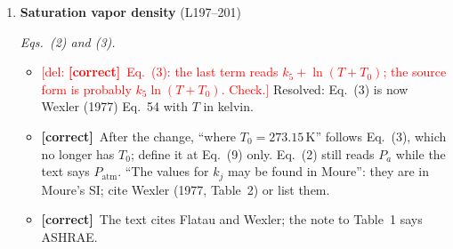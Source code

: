 \documentclass[11pt]{article}
\newcommand{\Pg}[3]{\item \textbf{#1} {\small(#2)}\par\textit{#3}}
\newcommand{\tC}{\textcolor{miss}{\textbf{[correct]}}\ }
\newcommand{\tG}{\textcolor{stale}{\textbf{[wording]}}\ }
\newcommand{\tA}{\textcolor{have}{\textbf{[add]}}\ }
\newcommand{\add}[1]{\textcolor{revA}{#1}}
\newcommand{\del}[1]{\textcolor{red}{[del: #1]}}
\begin{document}
\begin{enumerate}
  \begin{itemize}
  \item \tC Eq.~(1b): the latent-heat term should carry $\rho_{\mathrm{ice}}$,
    as the solver does, not the mixture density, which integrates to about
    half across the interface.
    \add{Done (D-L307).}
  \item \tC ``$\varepsilon$ represents the interface width'': it is the
    interface parameter; the visible band is $9.2\,\varepsilon$ (Table~3
    says so).
  \item \tC Eq.~(1c) as printed has no $\xi_v$, but Tables 3 and 4 list
    $\xi_v = 10^{-3}$. Show it or explain it in one sentence.
  \item \tG ``Allen-Kahn'' (Cahn); ``localize this phenomena'' (localizes
    this term); the sentence defining $\alpha_{\mathrm{sub}}$ and $\rho_i$
    is run together.
  \item \tA $M_{\mathrm{sub}}$ and $\alpha_{\mathrm{sub}}$ are named and never
    given: $M_{\mathrm{sub}} = \varepsilon/(3\tau_{\mathrm{sub}})$,
    $\alpha_{\mathrm{sub}} = \lambda_{\mathrm{sub}}/\tau_{\mathrm{sub}}$,
    or a pointer to Moure \& Fu.
    \add{The draft now points to a new appendix ``Model Scaling Parameters'' (D-L311), which is a heading only; its label is spelled \texttt{Sclaing}.}
  \end{itemize}
\Pg{Saturation vapor density}{L197--201}{Eqs.~(2) and (3).}
  \begin{itemize}
  \item \del{\tC Eq.~(3): the last term reads $k_5 + \ln(T + T_0)$; the source
    form is probably $k_5\ln(T + T_0)$. Check.}
    \add{Resolved: Eq.~(3) is now Wexler (1977) Eq.~54 with $T$ in kelvin.}
  \item \add{\tC After the change, ``where $T_0 = 273.15$\,K'' follows Eq.~(3), which no longer has $T_0$; define it at Eq.~(9) only. Eq.~(2) still reads $P_a$ while the text says $P_{\mathrm{atm}}$. ``The values for $k_j$ may be found in Moure'': they are in Moure's SI; cite Wexler (1977, Table~2) or list them.}
  \item \tC The text cites Flatau and Wexler; the note to Table~1 says
    ASHRAE.

\end{itemize}
\end{enumerate}
\end{document}
